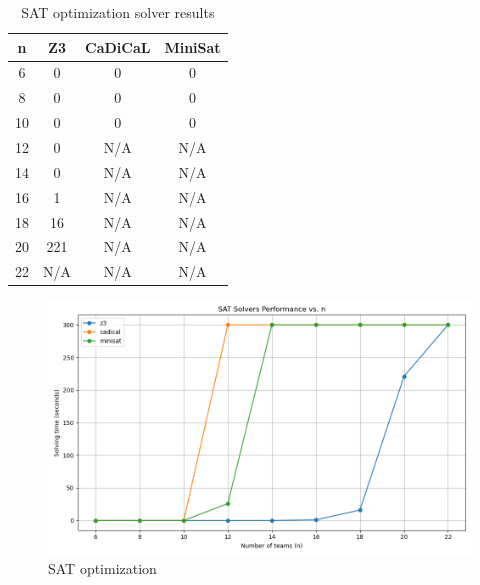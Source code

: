 \begin{table}[H]
\centering
\small
{%
\begin{tabular}{|c|c|c|c|}
\toprule
\textbf{n} & \textbf{Z3} &\textbf{CaDiCaL} & \textbf{MiniSat} \\
\midrule
6  & 0   & 0   & 0   \\
8  & 0   & 0   & 0   \\
10 & 0   & 0   & 0   \\
12 & 0   & N/A & N/A \\
14 & 0   & N/A & N/A \\
16 & 1   & N/A & N/A \\
18 & 16  & N/A & N/A \\
20 & 221 & N/A & N/A \\
22 & N/A & N/A & N/A \\
\bottomrule
\end{tabular}
}
\caption{SAT optimization solver results}
\label{table:mip-results}
\end{table}

\begin{figure}[H]
    \centering
    \includegraphics[width=0.8\linewidth]{img/SAT-result.png}
    \caption{SAT optimization}
    \label{fig:SAT-result}
\end{figure}
